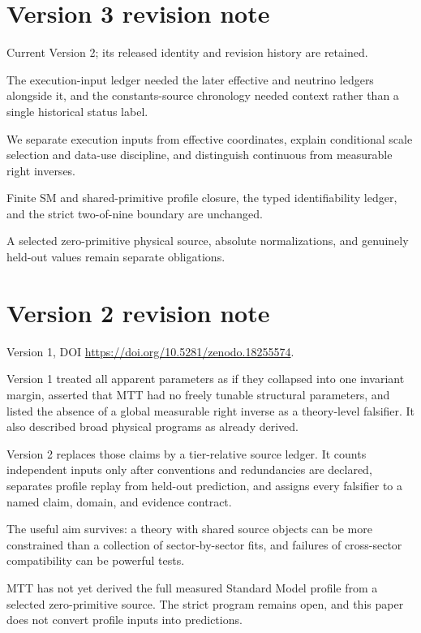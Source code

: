 \documentclass[11pt]{article}
\begin{document}
\section*{Version 3 revision note}
\begin{description}[style=nextline]
\item[Supersedes.] Current Version 2; its released identity and revision
history are retained.
\item[Reason.] The execution-input ledger needed the later effective and
neutrino ledgers alongside it, and the constants-source chronology needed
context rather than a single historical status label.
\item[Resolution.] We separate execution inputs from effective coordinates,
explain conditional scale selection and data-use discipline, and distinguish
continuous from measurable right inverses.
\item[Retained.] Finite SM and shared-primitive profile closure, the typed
identifiability ledger, and the strict two-of-nine boundary are unchanged.
\item[Open boundary.] A selected zero-primitive physical source, absolute
normalizations, and genuinely held-out values remain separate obligations.
\end{description}

\section*{Version 2 revision note}

\begin{description}[style=nextline]
\item[Supersedes.]
Version 1, DOI
\url{https://doi.org/10.5281/zenodo.18255574}.
\item[Reason.]
Version 1 treated all apparent parameters as if they collapsed into one
invariant margin, asserted that MTT had no freely tunable structural
parameters, and listed the absence of a global measurable right inverse as a
theory-level falsifier. It also described broad physical programs as already
derived.
\item[Resolution.]
Version 2 replaces those claims by a tier-relative source ledger. It counts
independent inputs only after conventions and redundancies are declared,
separates profile replay from held-out prediction, and assigns every
falsifier to a named claim, domain, and evidence contract.
\item[Retained content.]
The useful aim survives: a theory with shared source objects can be more
constrained than a collection of sector-by-sector fits, and failures of
cross-sector compatibility can be powerful tests.
\item[Open boundary.]
MTT has not yet derived the full measured Standard Model profile from a
selected zero-primitive source. The strict program remains open, and this
paper does not convert profile inputs into predictions.
\end{description}
\end{document}
